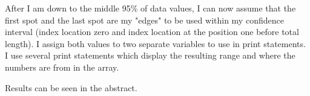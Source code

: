 \documentclass[twocolumn]{revtex4}
\begin{document}
After I am down to the middle 95\% of data values, I can now assume that the first spot and the last spot are my "edges" to be used within my confidence interval (index location zero and index location at the position one before total length). I assign both values to two separate variables to use in print statements. I use several print statements which display the resulting range and where the numbers are from in the array. 

\begin{it}Results can be seen in the abstract.
\end{it}

\end{document}
